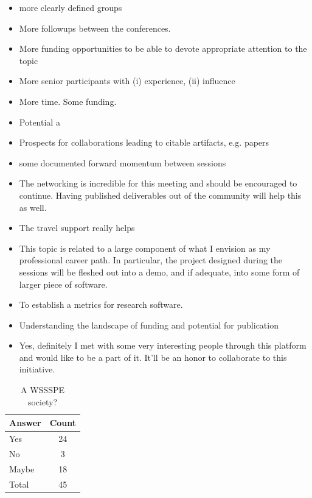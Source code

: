 \begin{itemize}
\item more clearly defined groups
\item More followups between the conferences.
\item More funding opportunities to be able to devote appropriate attention to the topic
\item More senior participants with (i) experience, (ii) influence
\item More time. Some funding.
\item Potential a
\item Prospects for collaborations leading to citable artifacts, e.g. papers
\item some documented forward momentum between sessions
\item The networking is incredible for this meeting and should be encouraged to continue. Having published deliverables out of the community will help this as well.
\item The travel support really helps
\item This topic is related to a large component of what I envision as my professional career path. In particular, the project designed during the sessions will be fleshed out into a demo, and if adequate, into some form of larger piece of software.
\item To establish a metrics for research software.
\item Understanding the landscape of funding and potential for publication
\item Yes, definitely I met with some very interesting people through this platform and would like to be a part of it. It'll be an honor to collaborate to this initiative.
\end{itemize}




\begin{table}[h!]
\centering
\caption{A WSSSPE society?}
\label{tab:survey_society}
\begin{tabular}{|l|c|}
\hline
{\bf Answer} &
{\bf Count} \\ \hline
Yes &
24 \\
No &
3 \\
Maybe &
18 \\
Total &
45 \\
\hline
\end{tabular}
\end{table}

